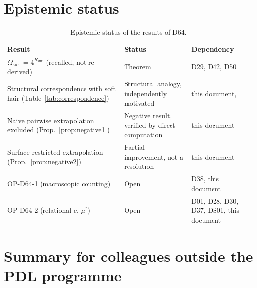 \documentclass[12pt,a4paper]{article}
\newcommand{\Rsurf}{R_{\mathrm{surf}}}
\newcommand{\Omegasurf}{\Omega_{\mathrm{surf}}}
\begin{document}
\section{Epistemic status}
\label{sec:epistemic}

\begin{table}[H]
\centering
\caption{Epistemic status of the results of D64.}
\label{tab:epistemic}
\small
\begin{tabular}{p{6.5cm}p{3cm}p{4cm}}
\toprule
Result & Status & Dependency \\
\midrule
$\Omegasurf = 4^{\Rsurf}$ (recalled, not re-derived) & Theorem & D29, D42, D50 \\[4pt]
Structural correspondence with soft hair (Table~\ref{tab:correspondence}) & Structural analogy, independently motivated & this document, \cite{HPS2016,HPS2017,N02} \\[4pt]
Naive pairwise extrapolation excluded (Prop.~\ref{prop:negative1}) & Negative result, verified by direct computation & this document \\[4pt]
Surface-restricted extrapolation (Prop.~\ref{prop:negative2}) & Partial improvement, not a resolution & this document \\[4pt]
OP-D64-1 (macroscopic counting) & Open & D38, this document \\[4pt]
OP-D64-2 (relational $c$, $\mu^*$) & Open & D01, D28, D30, D37, DS01, this document \\
\bottomrule
\end{tabular}
\end{table}

\section{Summary for colleagues outside the PDL programme}
\label{sec:summary}
\end{document}
